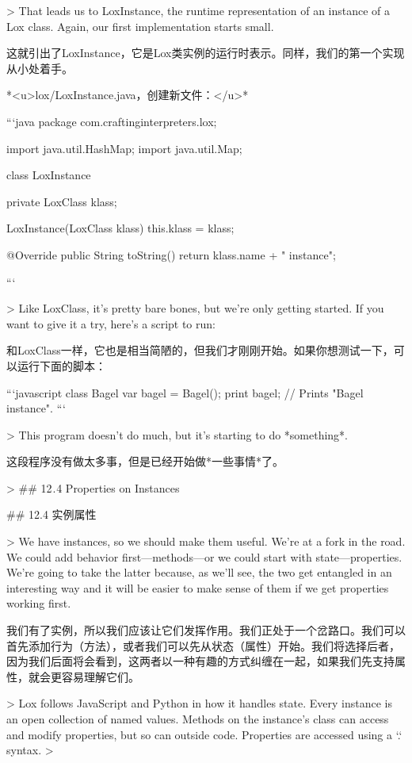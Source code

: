 \documentclass[cn,11pt,chinese]{elegantbook}
\begin{document}
{{{{{{{{{{{{{{{{{{{{> That leads us to LoxInstance, the runtime representation of an instance of a Lox class. Again, our first implementation starts small.

这就引出了LoxInstance，它是Lox类实例的运行时表示。同样，我们的第一个实现从小处着手。

*<u>lox/LoxInstance.java，创建新文件：</u>*

```java
package com.craftinginterpreters.lox;

import java.util.HashMap;
import java.util.Map;

class LoxInstance {
  private LoxClass klass;

  LoxInstance(LoxClass klass) {
    this.klass = klass;
  }

  @Override
  public String toString() {
    return klass.name + " instance";
  }
}
```

> Like LoxClass, it’s pretty bare bones, but we’re only getting started. If you want to give it a try, here’s a script to run:

和LoxClass一样，它也是相当简陋的，但我们才刚刚开始。如果你想测试一下，可以运行下面的脚本：

```javascript
class Bagel {}
var bagel = Bagel();
print bagel; // Prints "Bagel instance".
```

> This program doesn’t do much, but it’s starting to do *something*.

这段程序没有做太多事，但是已经开始做*一些事情*了。

> ## 12 . 4 Properties on Instances

## 12.4 实例属性

> We have instances, so we should make them useful. We’re at a fork in the road. We could add behavior first—methods—or we could start with state—properties. We’re going to take the latter because, as we’ll see, the two get entangled in an interesting way and it will be easier to make sense of them if we get properties working first.

我们有了实例，所以我们应该让它们发挥作用。我们正处于一个岔路口。我们可以首先添加行为（方法），或者我们可以先从状态（属性）开始。我们将选择后者，因为我们后面将会看到，这两者以一种有趣的方式纠缠在一起，如果我们先支持属性，就会更容易理解它们。

> Lox follows JavaScript and Python in how it handles state. Every instance is an open collection of named values. Methods on the instance’s class can access and modify properties, but so can outside code. Properties are accessed using a `.` syntax.
>

}}}}}}}}}}}}}}}}}}}}
\end{document}
